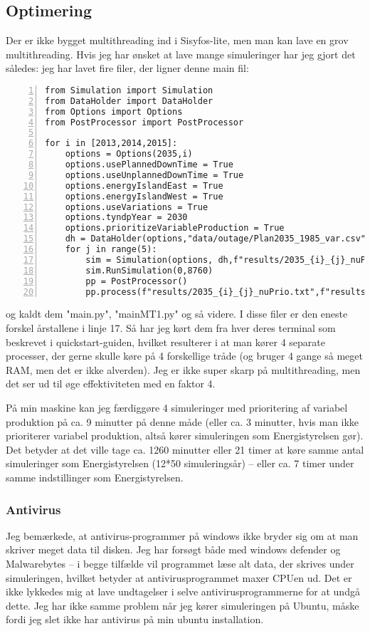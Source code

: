 \documentclass{article}
\begin{document}
\subsection{Optimering}
Der er ikke bygget multithreading ind i Sisyfos-lite, men man kan lave en grov multithreading. Hvis jeg har ønsket at lave mange simuleringer har jeg gjort det således: jeg har lavet fire filer, der ligner denne main fil:
\begin{Verbatim}[numbers=left,xleftmargin=5mm]
from Simulation import Simulation
from DataHolder import DataHolder
from Options import Options
from PostProcessor import PostProcessor

for i in [2013,2014,2015]:
    options = Options(2035,i)
    options.usePlannedDownTime = True
    options.useUnplannedDownTime = True
    options.energyIslandEast = True
    options.energyIslandWest = True
    options.useVariations = True
    options.tyndpYear = 2030
    options.prioritizeVariableProduction = True
    dh = DataHolder(options,"data/outage/Plan2035_1985_var.csv")
    for j in range(5):
        sim = Simulation(options, dh,f"results/2035_{i}_{j}_nuPrio.txt", True, False)
        sim.RunSimulation(0,8760)
        pp = PostProcessor()
        pp.process(f"results/2035_{i}_{j}_nuPrio.txt",f"results/2035_{i}_{j}_nuPrio_pp.txt"
\end{Verbatim}
og kaldt dem "main.py", "mainMT1.py" og så videre. I disse filer er den eneste forskel årstallene i linje 17. Så har jeg kørt dem fra hver deres terminal som beskrevet i quickstart-guiden, hvilket resulterer i at man kører 4 separate processer, der gerne skulle køre på 4 forskellige tråde (og bruger 4 gange så meget RAM, men det er ikke alverden). Jeg er ikke super skarp på multithreading, men det ser ud til øge effektiviteten med en faktor 4.

På min maskine kan jeg færdiggøre 4 simuleringer med prioritering af variabel produktion på ca. 9 minutter på denne måde (eller ca. 3 minutter, hvis man ikke prioriterer variabel produktion, altså kører simuleringen som Energistyrelsen gør). Det betyder at det ville tage ca. 1260 minutter eller 21 timer at køre samme antal simuleringer som Energistyrelsen (12*50 simuleringsår) -- eller ca. 7 timer under samme indstillinger som Energistyrelsen.

\subsubsection{Antivirus}
Jeg bemærkede, at antivirus-programmer på windows ikke bryder sig om at man skriver meget data til disken. Jeg har forsøgt både med windows defender og Malwarebytes -- i begge tilfælde vil programmet læse alt data, der skrives under simuleringen, hvilket betyder at antivirusprogrammet maxer CPUen ud. Det er ikke lykkedes mig at lave undtagelser i selve antivirusprogrammerne for at undgå dette. Jeg har ikke samme problem når jeg kører simuleringen på Ubuntu, måske fordi jeg slet ikke har antivirus på min ubuntu installation. 
\end{document}
